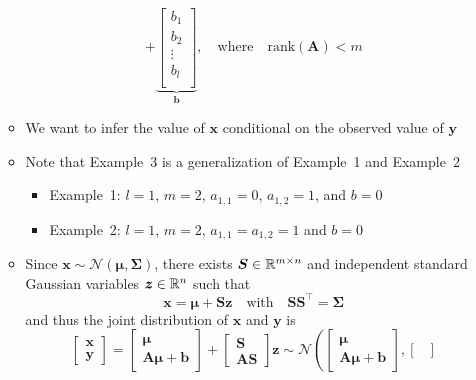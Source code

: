 \documentclass[12pt,a4paper]{article}
\begin{document}
\begin{itemize}
\begin{itemize}
\begin{equation}
      +
      \underbrace{
      \begin{bmatrix}
        b_{1} \\
        b_{2} \\
        \vdots \\
        b_{l} \\
      \end{bmatrix}}_{\bm{b}},
    \quad\text{where}\quad \mathrm{rank}(\bm{A})<m
    \end{equation}
  \item We want to infer the value of $\bm{x}$ conditional on the observed value of $\bm{y}$
  \item Note that Example~3 is a generalization of Example~1 and Example~2
    \begin{itemize}
    \item Example~1: $l=1$, $m=2$, $a_{1,1}=0$, $a_{1,2}=1$, and $b=0$
    \item Example~2: $l=1$, $m=2$, $a_{1,1}= a_{1,2}=1$ and $b=0$
    \end{itemize}
  \item Since $\bm{x}\sim \mathcal{N}(\bm{\mu},\bm{\Sigma})$,
    there exists $\bm{S}\in \mathbb{R}^{m\times n}$ and
    independent standard Gaussian variables $\bm{z}\in \mathbb{R}^{n}$ such that
    \begin{equation}\nonumber%
      \bm{x} = \bm{\mu} + \bm{S}\bm{z}
      \quad \text{with}\quad \bm{S}\bm{S}^{\top} = \bm{\Sigma}
    \end{equation}
    and thus the joint distribution of $\bm{x}$ and $\bm{y}$ is
    \begin{equation}\nonumber%
      \begin{bmatrix}
        \bm{x} \\ \bm{y}
      \end{bmatrix}
      =
      \begin{bmatrix}
        \bm{\mu} \\ \bm{A}\bm{\mu} + \bm{b}
      \end{bmatrix}
      +
      \begin{bmatrix}
        \bm{S}\\
        \bm{A}\bm{S}
      \end{bmatrix}
      \bm{z}
      \sim
      \mathcal{N}
      \left(
      \begin{bmatrix}
        \bm{\mu} \\ \bm{A}\bm{\mu} + \bm{b}
      \end{bmatrix},
      \begin{bmatrix}

\end{bmatrix}
\end{equation}
\end{itemize}
\end{itemize}
\end{document}
